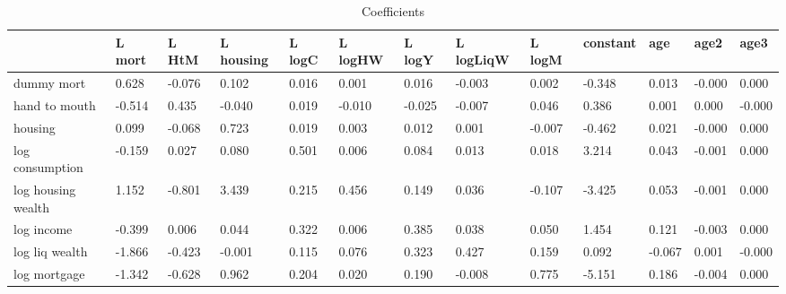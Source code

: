 \begin{table}[htbp]
\caption{\label{clabel} Coefficients}\centering\medskip
\begin{tabular}{lllllllllllll} \hline \hline
 & L mort  & L HtM  & L housing  & L logC  & L logHW  & L logY  & L logLiqW  & L logM  & constant  & age  & age2  & age3  \\  \hline 
dummy mort &     0.628 &    -0.076 &     0.102 &     0.016 &     0.001 &     0.016 &    -0.003 &     0.002 &    -0.348 &     0.013 &    -0.000 &     0.000 \\  
hand to mouth &    -0.514 &     0.435 &    -0.040 &     0.019 &    -0.010 &    -0.025 &    -0.007 &     0.046 &     0.386 &     0.001 &     0.000 &    -0.000 \\  
housing &     0.099 &    -0.068 &     0.723 &     0.019 &     0.003 &     0.012 &     0.001 &    -0.007 &    -0.462 &     0.021 &    -0.000 &     0.000 \\  
log consumption &    -0.159 &     0.027 &     0.080 &     0.501 &     0.006 &     0.084 &     0.013 &     0.018 &     3.214 &     0.043 &    -0.001 &     0.000 \\  
log housing wealth &     1.152 &    -0.801 &     3.439 &     0.215 &     0.456 &     0.149 &     0.036 &    -0.107 &    -3.425 &     0.053 &    -0.001 &     0.000 \\  
log income &    -0.399 &     0.006 &     0.044 &     0.322 &     0.006 &     0.385 &     0.038 &     0.050 &     1.454 &     0.121 &    -0.003 &     0.000 \\  
log liq wealth &    -1.866 &    -0.423 &    -0.001 &     0.115 &     0.076 &     0.323 &     0.427 &     0.159 &     0.092 &    -0.067 &     0.001 &    -0.000 \\  
log mortgage &    -1.342 &    -0.628 &     0.962 &     0.204 &     0.020 &     0.190 &    -0.008 &     0.775 &    -5.151 &     0.186 &    -0.004 &     0.000 \\  
\hline \hline \end{tabular}
\end{table}
